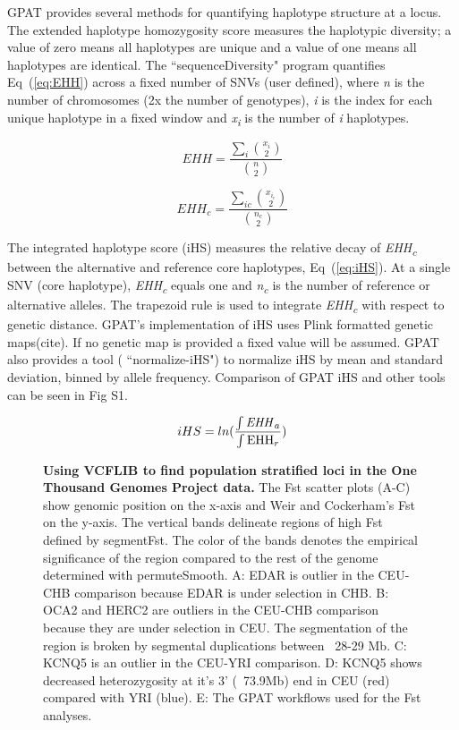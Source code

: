 \documentclass[10pt,letterpaper]{article}
\begin{document}
GPAT provides several methods for quantifying haplotype structure at a locus.  The extended haplotype homozygosity score measures the haplotypic diversity; a value of zero means all haplotypes are unique and a value of one means all haplotypes are identical. The ``sequenceDiversity" program quantifies Eq~(\ref{eq:EHH}) across a fixed number of SNVs (user defined), where \textit{n} is the number of chromosomes (2x the number of genotypes), \textit{i} is the index for each unique haplotype in a fixed window and \textit{x\textsubscript{i}} is the number of \textit{i} haplotypes.  


\begin{equation}\label{eq:EHH} 
EHH=\frac{\sum_{i} \binom{x_i}{2}}{\binom{n}{2}}
\end{equation}

\begin{equation}\label{eq:EHHC} 
EHH_c=\frac{\sum_{ic} \binom{x_i_c}{2}}{\binom{n_c}{2}}
\end{equation}


The integrated haplotype score (iHS) measures the relative decay of \textit{EHH\textsubscript{c}} between the alternative and reference core haplotypes,  Eq~(\ref{eq:iHS}).  At a single SNV (core haplotype), \textit{EHH\textsubscript{c}} equals one and \textit{n\textsubscript{c}} is the number of reference or alternative alleles.  The trapezoid rule is used to integrate  \textit{EHH\textsubscript{c}} with respect to genetic distance.  GPAT's implementation of iHS uses Plink formatted genetic maps(cite).  If no genetic map is provided a fixed value will be assumed.  GPAT also provides a tool ( ``normalize-iHS") to normalize iHS by mean and standard deviation, binned by allele frequency.  Comparison of GPAT iHS and other tools can be seen in Fig S1\cite{selscan}\cite{voight}.

\begin{equation}\label{eq:iHS} 
iHS = ln(\frac{\int \textrm{\textit{EHH}}_a}{ \int \textrm{EHH}_r } )
\end{equation}



\begin{figure}[h]

\caption{{\bf Using VCFLIB to find population stratified loci in the One Thousand Genomes Project data.} The Fst scatter plots (A-C) show genomic position on the x-axis and Weir and Cockerham's Fst on the y-axis.  The vertical bands delineate regions of high Fst defined by segmentFst.  The color of the bands denotes the empirical significance of the region compared to the rest of the genome determined with permuteSmooth.  A: EDAR is outlier in the CEU-CHB comparison because EDAR is under selection in CHB.  B: OCA2 and HERC2 are outliers in the CEU-CHB comparison because they are under selection in CEU.  The segmentation of the region is broken by segmental duplications between ~28-29 Mb.  C: KCNQ5 is an outlier in the CEU-YRI comparison.  D:  KCNQ5 shows decreased heterozygosity at it's 3' (~73.9Mb) end in CEU (red) compared with YRI (blue).  E: The GPAT workflows used for the Fst analyses. }
\label{fig1}
\end{figure}
\end{document}
